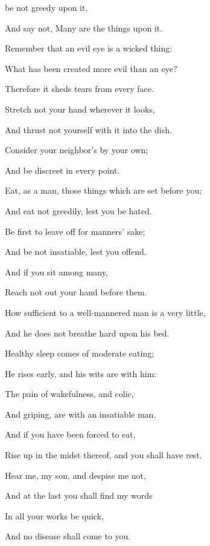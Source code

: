 { be not greedy upon it,
\par }{\Q And say not, Many are the things upon it.
\par }{\Q {}Remember that an evil eye is a wicked thing:
\par }{\Q What has been created more evil than an eye?
\par }{\Q Therefore it sheds tears from every face.
\par }{\Q {}Stretch not your hand wherever it looks,
\par }{\Q And thrust not yourself with it into the dish.
\par }{\Q {}Consider your neighbor’s
{} by your own;
\par }{\Q And be discreet in every point.
\par }{\Q {}Eat, as
{} a man, those things which are set before you;
\par }{\Q And eat not greedily, lest you be hated.
\par }{\Q {}Be first to leave off for manners’ sake;
\par }{\Q And be not insatiable, lest you offend.
\par }{\Q {}And if you sit among many,
\par }{\Q Reach not out your hand before them.
\par }{\BB \par }{\Q {}How sufficient to a well-mannered man is a very little,
\par }{\Q And he does not breathe hard upon his bed.
\par }{\Q {}Healthy sleep comes of moderate eating;
\par }{\Q He rises early, and his wits are with him:
\par }{\Q The pain of wakefulness, and colic,
\par }{\Q And griping, are with an insatiable man.
\par }{\Q {}And if you have been forced to eat,
\par }{\Q Rise up in the midst thereof, and you shall have rest.
\par }{\Q {}Hear me, my son, and despise me not,
\par }{\Q And at the last you shall find my words
{}
\par }{\Q In all your works be quick,
\par }{\Q And no disease shall come to you.
}
